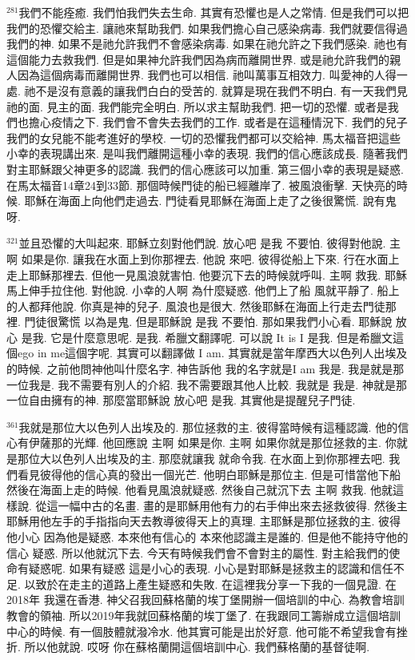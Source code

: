 \documentclass{book}
\begin{document}
$^{281}$我們不能痊癒.
我們怕我們失去生命.
其實有恐懼也是人之常情.
但是我們可以把我們的恐懼交給主.
讓祂來幫助我們.
如果我們擔心自己感染病毒.
我們就要信得過我們的神.
如果不是祂允許我們不會感染病毒.
如果在祂允許之下我們感染.
祂也有這個能力去救我們.
但是如果神允許我們因為病而離開世界.
或是祂允許我們的親人因為這個病毒而離開世界.
我們也可以相信.
祂叫萬事互相效力.
叫愛神的人得一處.
祂不是沒有意義的讓我們白白的受苦的.
就算是現在我們不明白.
有一天我們見祂的面.
見主的面.
我們能完全明白.
所以求主幫助我們.
把一切的恐懼.
或者是我們也擔心疫情之下.
我們會不會失去我們的工作.
或者是在這種情況下.
我們的兒子我們的女兒能不能考進好的學校.
一切的恐懼我們都可以交給神.
馬太福音把這些小幸的表現講出來.
是叫我們離開這種小幸的表現.
我們的信心應該成長.
隨著我們對主耶穌跟父神更多的認識.
我們的信心應該可以加重.
第三個小幸的表現是疑惑.
在馬太福音14章24到33節.
那個時候門徒的船已經離岸了.
被風浪衝擊.
天快亮的時候.
耶穌在海面上向他們走過去.
門徒看見耶穌在海面上走了之後很驚慌.
說有鬼呀.

$^{321}$並且恐懼的大叫起來.
耶穌立刻對他們說.
放心吧 是我 不要怕.
彼得對他說.
主啊 如果是你.
讓我在水面上到你那裡去.
他說 來吧.
彼得從船上下來.
行在水面上走上耶穌那裡去.
但他一見風浪就害怕.
他要沉下去的時候就呼叫.
主啊 救我.
耶穌馬上伸手拉住他.
對他說.
小幸的人啊 為什麼疑惑.
他們上了船 風就平靜了.
船上的人都拜他說.
你真是神的兒子.
風浪也是很大.
然後耶穌在海面上行走去門徒那裡.
門徒很驚慌 以為是鬼.
但是耶穌說 是我 不要怕.
那如果我們小心看.
耶穌說 放心 是我.
它是什麼意思呢.
是我.
希臘文翻譯呢.
可以說 It is I 是我.
但是希臘文這個ego in me這個字呢.
其實可以翻譯做 I am.
其實就是當年摩西大以色列人出埃及的時候.
之前他問神他叫什麼名字.
神告訴他 我的名字就是I am 我是.
我是就是那一位我是.
我不需要有別人的介紹.
我不需要跟其他人比較.
我就是 我是.
神就是那一位自由擁有的神.
那麼當耶穌說 放心吧 是我.
其實他是提醒兒子門徒.

$^{361}$我就是那位大以色列人出埃及的.
那位拯救的主.
彼得當時候有這種認識.
他的信心有伊薩那的光輝.
他回應說 主啊 如果是你.
主啊 如果你就是那位拯救的主.
你就是那位大以色列人出埃及的主.
那麼就讓我 就命令我.
在水面上到你那裡去吧.
我們看見彼得他的信心真的發出一個光芒.
他明白耶穌是那位主.
但是可惜當他下船然後在海面上走的時候.
他看見風浪就疑惑.
然後自己就沉下去 主啊 救我.
他就這樣說.
從這一幅中古的名畫.
畫的是耶穌用他有力的右手伸出來去拯救彼得.
然後主耶穌用他左手的手指指向天去教導彼得天上的真理.
主耶穌是那位拯救的主.
彼得他小心 因為他是疑惑.
本來他有信心的 本來他認識主是誰的.
但是他不能持守他的信心 疑惑.
所以他就沉下去.
今天有時候我們會不會對主的屬性.
對主給我們的使命有疑惑呢.
如果有疑惑 這是小心的表現.
小心是對耶穌是拯救主的認識和信任不足.
以致於在走主的道路上產生疑惑和失敗.
在這裡我分享一下我的一個見證.
在2018年 我還在香港.
神父召我回蘇格蘭的埃丁堡開辦一個培訓的中心.
為教會培訓教會的領袖.
所以2019年我就回蘇格蘭的埃丁堡了.
在我跟同工籌辦成立這個培訓中心的時候.
有一個肢體就潑冷水.
他其實可能是出於好意.
他可能不希望我會有挫折.
所以他就說.
哎呀 你在蘇格蘭開這個培訓中心.
我們蘇格蘭的基督徒啊.
\end{document}
